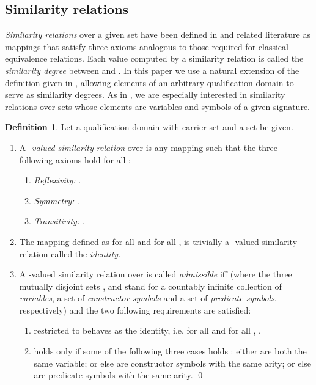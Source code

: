 \documentclass{sigplanconf}
\theoremstyle{definition}
\newtheorem{definition}{Definition}
\theoremstyle{plain}
\begin{document}
\subsection{Similarity relations} \label{SR}

{\em Similarity relations} over a given set   have been defined in \cite{Ses02} and related literature as mappings  that satisfy three axioms analogous to those required for classical equivalence relations. Each value  computed by a similarity relation  is called the {\em similarity  degree} between  and . In this paper we use a natural extension of the definition given in \cite{Ses02}, allowing elements of an arbitrary qualification domain   to serve as similarity degrees. As in \cite{Ses02}, we  are especially interested in similarity relations over sets  whose elements are variables and symbols of a given signature.

\begin{definition} \label{defSR} Let a qualification domain  with carrier set  and a set  be given.
\begin{enumerate}
\item A {\em -valued similarity relation} over  is any mapping   such that the three following axioms hold for all :
    \begin{enumerate}
        \item {\em Reflexivity:} .
        \item {\em Symmetry:} .
        \item {\em Transitivity:} .
    \end{enumerate}
\item The mapping  defined as  for all  and  for all ,  is trivially a -valued similarity relation called the \emph{identity}.
\item A -valued similarity relation  over  is called {\em admissible} iff  (where the three mutually disjoint sets ,  and  stand for a countably infinite collection of {\em variables}, a set of {\em constructor symbols} and a set of {\em predicate symbols}, respectively) and the two following requirements are satisfied:
    \begin{enumerate}
        \item  restricted to  behaves as the identity, i.e.  for all  and  for all , .
        \item  holds only if some of the following three cases holds : either  are both the same variable; or else  are constructor symbols with the same arity; or else  are predicate  symbols with the same arity. \qed
    \end{enumerate}
\end{enumerate}
\end{definition}
\end{document}
